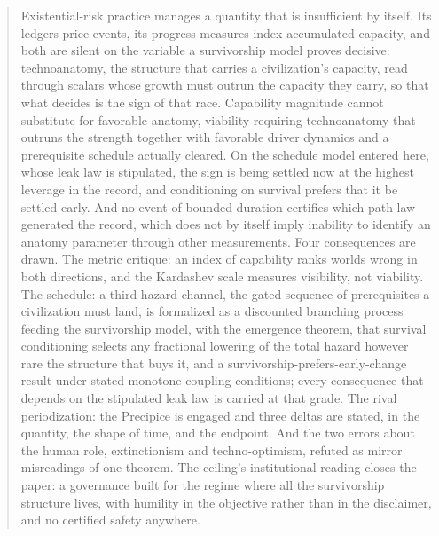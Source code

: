 \begin{abstract}
Existential-risk practice manages a quantity that is insufficient by itself. Its ledgers price events, its progress measures index accumulated capacity, and both are silent on the variable a survivorship model proves decisive: technoanatomy, the structure that carries a civilization's capacity, read through scalars whose growth must outrun the capacity they carry, so that what decides is the sign of that race. Capability magnitude cannot substitute for favorable anatomy, viability requiring technoanatomy that outruns the strength together with favorable driver dynamics and a prerequisite schedule actually cleared. On the schedule model entered here, whose leak law is stipulated, the sign is being settled now at the highest leverage in the record, and conditioning on survival prefers that it be settled early. And no event of bounded duration certifies which path law generated the record, which does not by itself imply inability to identify an anatomy parameter through other measurements. Four consequences are drawn. The metric critique: an index of capability ranks worlds wrong in both directions, and the Kardashev scale measures visibility, not viability. The schedule: a third hazard channel, the gated sequence of prerequisites a civilization must land, is formalized as a discounted branching process feeding the survivorship model, with the emergence theorem, that survival conditioning selects any fractional lowering of the total hazard however rare the structure that buys it, and a survivorship-prefers-early-change result under stated monotone-coupling conditions; every consequence that depends on the stipulated leak law is carried at that grade. The rival periodization: the Precipice is engaged and three deltas are stated, in the quantity, the shape of time, and the endpoint. And the two errors about the human role, extinctionism and techno-optimism, refuted as mirror misreadings of one theorem. The ceiling's institutional reading closes the paper: a governance built for the regime where all the survivorship structure lives, with humility in the objective rather than in the disclaimer, and no certified safety anywhere.

\end{abstract}
